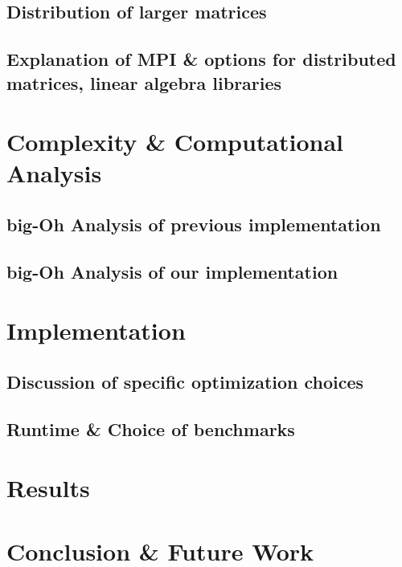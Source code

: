 \documentclass[5p]{elsarticle}
\begin{document}
\subsection{Distribution of larger matrices} 
\subsection{Explanation of MPI \& options for distributed matrices, linear algebra libraries}

\section{Complexity \& Computational Analysis}

\subsection{big-Oh Analysis of previous implementation} 
\subsection{big-Oh Analysis of our implementation}

\section{Implementation}

\subsection{Discussion of specific optimization choices} 
\subsection{Runtime \& Choice of benchmarks} 

\section{Results}


\section{Conclusion \& Future Work}
\end{document}
